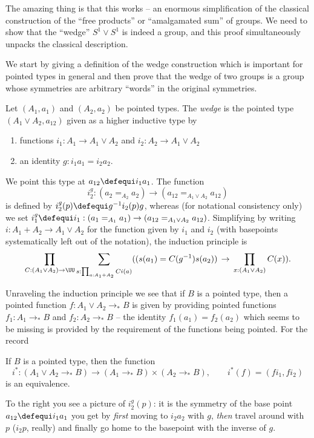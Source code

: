 The amazing thing is that this works -- an enormous simplification of the classical construction of the ``free products'' or ``amalgamated sum'' of groups.  We need to show that the ``wedge'' $S^1\vee S^1$ is indeed a group, and this proof simultaneously unpacks the classical description.

We start by giving a definition of the wedge construction which is important for pointed types in general and then prove that the wedge of two groups is a group whose symmetries are arbitrary ``words'' in the original symmetries.

\begin{definition}
  \label{def:wedge}
  Let $(A_1,a_1)$ and $(A_2,a_2)$ be pointed types.  The \emph{wedge} is the pointed type $(A_1\vee A_2,a_{12})$ given as a higher inductive type by
  \begin{enumerate}
  \item functions $i_1:A_1\to A_1\vee A_2$ and $i_2:A_2\to A_1\vee A_2$
  \item an identity $g:i_1a_1=i_2a_2$.
  \end{enumerate}
We point this type at $a_{12}\defequi i_1a_1$.
  The function
$$i^g_2:(a_2=_{A_2}a_2)\to(a_{12}=_{A_1\vee A_2}a_{12})$$
is defined by $i^g_2(p)\defequi g^{-1}i_2(p)g$, whereas (for notational consistency only) we set $i_1^g\defequi i_1:(a_1=_{A_1}a_1)\to(a_{12}=_{A_1\vee A_2}a_{12})$.
Simplifying by writing $i:A_1+A_2\to A_1\vee A_2$ for the function given by $i_1$ and $i_2$ (with basepoints systematically left out of the notation),
the induction principle is
$$\prod_{C:(A_1\vee A_2)\to\UU}\sum_{s:\prod_{a:A_1+A_2}Ci(a)}
((s(a_1)=C(g^{-1})s(a_2))\,\to\,\prod_{x:(A_1\vee A_2)}C(x)).$$
\end{definition}

Unraveling the induction principle we see that if $B$ is a pointed type, then a  pointed function $f:A_1\vee A_2\to_* B$ is given by providing pointed functions $f_1:A_1\to_* B$ and $f_2:A_2\to_* B$  -- the identity $f_1(a_1)=f_2(a_2)$ which seems to be missing is provided by the requirement of the functions being pointed.  For the record
\begin{lemma}
  \label{lem:univvee}
  If $B$ is a pointed type, then the function
  $$i^*:(A_1\vee A_2\to_*B)\to(A_1\to_*B)\times(A_2\to_*B),\qquad i^*(f)=(fi_1,fi_2)
$$
is an equivalence.
\end{lemma}



To the right you see a picture of $i_2^g(p)$: it is the symmetry of the base point $a_{12}\defequi i_1a_1$ you get by \emph{first} moving to $i_2a_2$ with $g$, \emph{then} travel around with $p$ ($i_2p$, really) and finally go home to the basepoint with the inverse of $g$.

